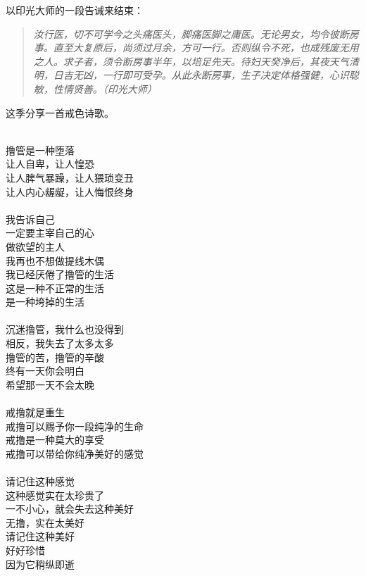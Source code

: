 以印光大师的一段告诫来结束：

\begin{quote}\it
    汝行医，切不可学今之头痛医头，脚痛医脚之庸医。无论男女，均令彼断房事。直至大复原后，尚须过月余，方可一行。否则纵令不死，也成残废无用之人。求子者，须令断房事半年，以培足先天。待妇天癸净后，其夜天气清明，日吉无凶，一行即可受孕。从此永断房事，生子决定体格强健，心识聪敏，性情贤善。（印光大师）
\end{quote}

这季分享一首戒色诗歌。

\begin{poem}[请记住戒撸的美好]
    \begin{multicols}{3}
        \begin{center}~\\
            撸管是一种堕落 \\ 让人自卑，让人惶恐 \\ 让人脾气暴躁，让人猥琐变丑 \\ 让人内心龌龊，让人悔恨终身 \\~\\
            我告诉自己 \\ 一定要主宰自己的心 \\ 做欲望的主人 \\ 我再也不想做提线木偶 \\ 我已经厌倦了撸管的生活 \\ 这是一种不正常的生活 \\ 是一种垮掉的生活 \\~\\
            沉迷撸管，我什么也没得到 \\ 相反，我失去了太多太多 \\ 撸管的苦，撸管的辛酸 \\ 终有一天你会明白 \\ 希望那一天不会太晚 \\~\\
            戒撸就是重生 \\ 戒撸可以赐予你一段纯净的生命 \\ 戒撸是一种莫大的享受 \\ 戒撸可以带给你纯净美好的感觉 \\~\\
            请记住这种感觉 \\ 这种感觉实在太珍贵了 \\ 一不小心，就会失去这种美好 \\ 无撸，实在太美好 \\ 请记住这种美好 \\ 好好珍惜 \\ 因为它稍纵即逝
        \end{center}
    \end{multicols}
\end{poem}
